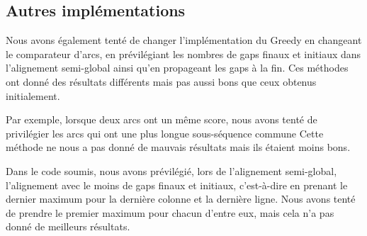 \FloatBarrier

\subsection{Autres implémentations}

Nous avons également tenté de changer l'implémentation du Greedy en changeant
le comparateur d'arcs, en prévilégiant les nombres de gaps finaux et initiaux
dans l'alignement semi-global ainsi qu'en propageant les gaps à la fin. Ces
méthodes ont donné des résultats différents mais pas aussi bons que ceux obtenus
initialement.

Par exemple, lorsque deux arcs ont un même score, nous avons tenté de
privilégier les arcs qui ont une plus longue sous-séquence commune Cette méthode
ne nous a pas donné de mauvais résultats mais ils étaient moins bons.

Dans le code soumis, nous avons prévilégié, lors de l'alignement semi-global,
l'alignement avec le moins de gaps finaux et initiaux, c'est-à-dire en
prenant le dernier maximum pour la dernière colonne et la dernière ligne. Nous
avons tenté de prendre le premier maximum pour chacun d'entre eux, mais cela n'a
pas donné de meilleurs résultats.


